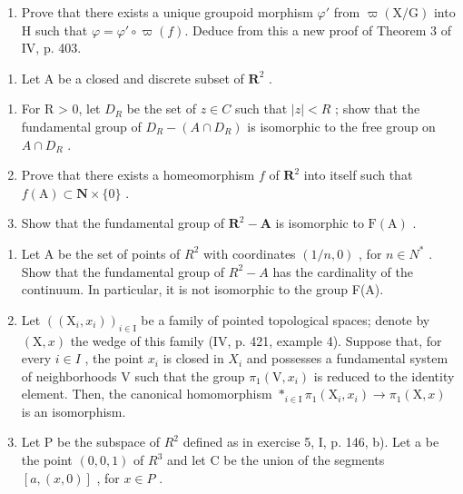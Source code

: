 \begin{enumerate}
\def\labelenumi{\alph{enumi})}
\setcounter{enumi}{2}
\tightlist
\item
  Prove that there exists a unique groupoid morphism \(\varphi'\) from \(\varpi(\mathrm{X/G})\) into H such that \(\varphi = \varphi' \circ \varpi(f)\). Deduce from this a new proof of Theorem 3 of IV, p. 403.
\end{enumerate}

\exercisegroup

\begin{enumerate}
\def\labelenumi{\arabic{enumi})}
\tightlist
\item
  Let A be a closed and discrete subset of \(\mathbf{R}^2\) .
\end{enumerate}

\begin{enumerate}
\def\labelenumi{\alph{enumi})}
\item
  For R \textgreater{} 0, let \(D_{R}\) be the set of \(z \in C\) such that \(|z| < R\) ; show that the fundamental group of \(D_{R} - (A \cap D_{R})\) is isomorphic to the free group on \(A \cap D_{R}\) .
\item
  Prove that there exists a homeomorphism \(f\) of \(\mathbf{R}^{2}\) into itself such that \(f(\mathrm{A})\subset\mathbf{N}\times\{0\}\) .
\item
  Show that the fundamental group of \(\mathbf{R}^2 - \mathbf{A}\) is isomorphic to \(\mathrm{F(A)}\) .
\end{enumerate}

\begin{enumerate}
\def\labelenumi{\arabic{enumi})}
\setcounter{enumi}{1}
\item
  Let A be the set of points of \(R^{2}\) with coordinates \((1/n,0)\) , for \(n\in N^{*}\) . Show that the fundamental group of \(R^{2}-A\) has the cardinality of the continuum. In particular, it is not isomorphic to the group F(A).
\item
  Let \(((\mathrm{X}_{i}, x_{i}))_{i \in \mathrm{I}}\) be a family of pointed topological spaces; denote by \((\mathrm{X}, x)\) the wedge of this family (IV, p. 421, example 4). Suppose that, for every \(i \in I\) , the point \(x_{i}\) is closed in \(X_{i}\) and possesses a fundamental system of neighborhoods V such that the group \(\pi_{1}(\mathrm{V}, x_{i})\) is reduced to the identity element. Then, the canonical homomorphism \(*_{i \in \mathrm{I}} \pi_{1}(\mathrm{X}_{i}, x_{i}) \to \pi_{1}(\mathrm{X}, x)\) is an isomorphism.
\item
  Let P be the subspace of \(R^{2}\) defined as in exercise 5, I, p. 146, b). Let a be the point \((0,0,1)\) of \(R^{3}\) and let C be the union of the segments \([a,(x,0)]\) , for \(x \in P\) .
\end{enumerate}

